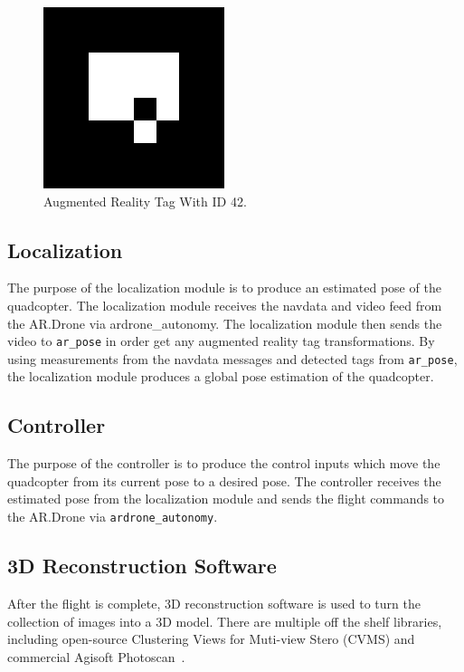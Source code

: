         \begin{figure}[ht]
                \centering
        		\includegraphics[width=200px]{../images/artag.png}
                \caption{Augmented Reality Tag With ID 42.}\label{fig:artag}
        \end{figure}


    \subsection{Localization}
        The purpose of the localization module is to produce an estimated pose of the quadcopter. The localization module receives the navdata and video feed from the AR.Drone via ardrone\_autonomy. The localization module then sends the video to \texttt{ar\_pose} in order get any augmented reality tag transformations. By using measurements from the navdata messages and detected tags from \texttt{ar\_pose}, the localization module produces a global pose estimation of the quadcopter.

    \subsection{Controller}
        The purpose of the controller is to produce the control inputs which move the quadcopter from its current pose to a desired pose. The controller receives the estimated pose from the localization module and sends the flight commands to the AR.Drone via \texttt{ardrone\_autonomy}.

    \subsection{3D Reconstruction Software}
        After the flight is complete, 3D reconstruction software is used to turn the collection of images into a 3D model. There are multiple off the shelf libraries, including open-source Clustering Views for Muti-view Stero (CVMS) and commercial Agisoft Photoscan~\cite{CMVS, Agisoft}. 

